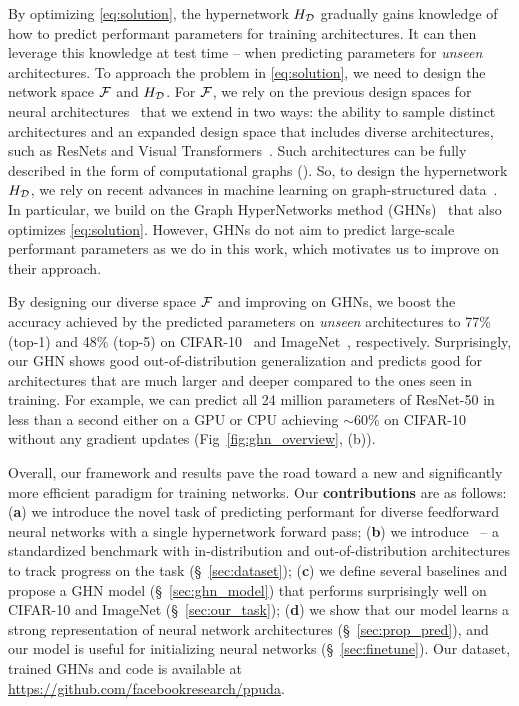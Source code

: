 By optimizing \eqref{eq:solution}, the hypernetwork $H_{\mathcal{D}}$ gradually gains knowledge of how to predict performant parameters for training architectures. It can then leverage this knowledge at test time -- when predicting parameters for \textit{unseen} architectures. 
To approach the problem in \eqref{eq:solution}, we need to design the network space $\mathcal{F}$ and $H_{\mathcal{D}}$.
For $\mathcal{F}$, we rely on the previous design spaces for neural architectures~\citep{liu2018darts} that we extend
in two ways: the ability to sample distinct architectures and an expanded design space that includes diverse architectures, such as ResNets and Visual Transformers~\citep{dosovitskiy2020image}. 
Such architectures can be fully described in the form of computational graphs (\fig{\ref{fig:ghn_overview}}). So, to design the hypernetwork $H_{\mathcal{D}}$, we rely on recent advances in machine learning on graph-structured data~\citep{kipf2016semi,velickovic2017graph,dwivedi2020benchmarking,zhang2018graph}.
In particular, we build on the Graph HyperNetworks method (GHNs)~\citep{zhang2018graph} that also optimizes \eqref{eq:solution}. However, GHNs do not aim to predict large-scale performant parameters as we do in this work, which motivates us to improve on their approach.

By designing our diverse space $\mathcal{F}$ and improving on GHNs, we boost the accuracy achieved by the predicted parameters on \textit{unseen} architectures to 77\% (top-1) and 48\% (top-5) on CIFAR-10~\citep{krizhevsky2009learning} and ImageNet~\citep{russakovsky2015imagenet}, respectively. Surprisingly, our GHN shows good out-of-distribution generalization and predicts good \params for architectures that are much larger and deeper compared to the ones seen in training. For example, we can predict all 24 million parameters of ResNet-50 in less than a second either on a GPU or CPU achieving $\sim$60\% on CIFAR-10 without any gradient updates (Fig~\ref{fig:ghn_overview}, (b)).

Overall, our framework and results pave the road toward a new and significantly more efficient paradigm for training networks.
Our \textbf{contributions} are as follows: (\textbf{a}) we introduce the novel task of predicting performant \params for diverse feedforward neural networks with a single hypernetwork forward pass;
(\textbf{b}) we introduce \dataset~-- a standardized benchmark with in-distribution and out-of-distribution architectures to track progress on the task (\S~\ref{sec:dataset}); (\textbf{c}) we define several baselines and propose a GHN model (\S~\ref{sec:ghn_model}) that performs surprisingly well on CIFAR-10 and ImageNet (\S~\ref{sec:our_task}); (\textbf{d}) we show that our model learns a strong representation of neural network architectures (\S~\ref{sec:prop_pred}), and our model is useful for initializing neural networks (\S~\ref{sec:finetune}).
Our \dataset dataset, trained GHNs and code is available at \textcolor{violet}{\url{https://github.com/facebookresearch/ppuda}}.

